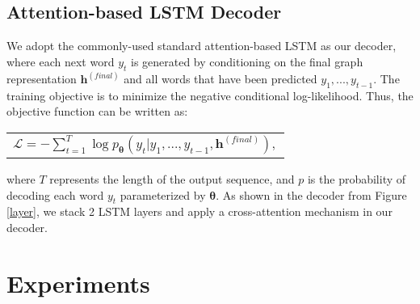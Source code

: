 \documentclass[11pt,a4paper]{article}
\renewcommand{\vec}[1]{\mathbf{#1}} \usepackage{color, colortbl}
\renewcommand{\vec}[1]{\mathbf{#1}}
\begin{document}
\subsection{Attention-based LSTM Decoder}
We adopt the commonly-used standard attention-based LSTM as our decoder, where each next word $y_t$ is generated by conditioning on the final graph representation $\vec{h}^{(final)}$ and all words that have been predicted $y_1, ..., y_{t-1}$. The training objective is to minimize the negative conditional log-likelihood. 
Thus, the objective function can be written as:
\begin{center}
\begin{tabular}{c}
		$
		\mathcal{L} =
-
        \sum\limits_{t=1 }^{T} 
\log p_{\boldsymbol{\theta}}(y_t | y_1, ..., y_{t-1}, \vec{h}^{(final)}),
		$
	\end{tabular}
\end{center}
where $T$ represents the length of the output sequence, and $p$ is the probability of decoding each word $y_t$ parameterized by $\boldsymbol{\theta}$.
As shown in the decoder from Figure \ref{layer}, we stack 2 LSTM layers and apply a cross-attention mechanism in our decoder.

\section{Experiments}
\end{document}
